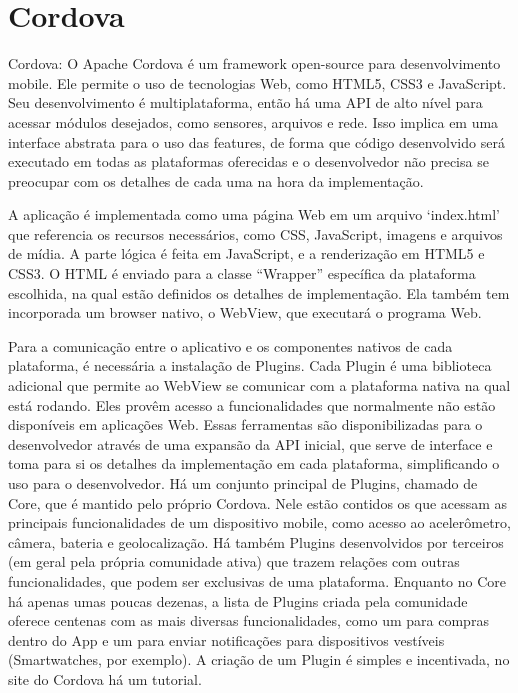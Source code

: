 \documentclass[a4paper,12pt]{article}
\begin{document}
\section{Cordova}

Cordova:
O Apache Cordova é um framework open-source para desenvolvimento mobile. Ele permite o uso de tecnologias Web, como HTML5, CSS3 e JavaScript. Seu desenvolvimento é multiplataforma, então há uma API de alto nível para acessar módulos desejados, como sensores, arquivos e rede. Isso implica em uma interface abstrata para o uso das features, de forma que código desenvolvido será executado em todas as plataformas oferecidas e o desenvolvedor não precisa se preocupar com os detalhes de cada uma na hora da implementação.


A aplicação é implementada como uma página Web em um arquivo ‘index.html’ que referencia os recursos necessários, como CSS, JavaScript, imagens e arquivos de mídia. A parte lógica é feita em JavaScript, e a renderização em HTML5 e CSS3. O HTML é enviado para a classe “Wrapper” específica da plataforma escolhida, na qual estão definidos os detalhes de implementação. Ela também tem incorporada um browser nativo, o WebView, que executará o programa Web.


Para a comunicação entre o aplicativo e os componentes nativos de cada plataforma, é necessária a instalação de Plugins.
Cada Plugin é uma biblioteca adicional que permite ao WebView se comunicar com a plataforma nativa na qual está rodando. Eles provêm acesso a funcionalidades que normalmente não estão disponíveis em aplicações Web. Essas ferramentas são disponibilizadas para o desenvolvedor através de uma expansão da API inicial, que serve de interface e toma para si os detalhes da implementação em cada plataforma, simplificando o uso para o desenvolvedor.
Há um conjunto principal de Plugins, chamado de Core, que é mantido pelo próprio Cordova. Nele estão contidos os que acessam as principais funcionalidades de um dispositivo mobile, como acesso ao acelerômetro, câmera, bateria e geolocalização.
Há também Plugins desenvolvidos por terceiros (em geral pela própria comunidade ativa) que trazem relações com outras funcionalidades, que podem ser exclusivas de uma plataforma. Enquanto no Core há apenas umas poucas dezenas, a lista de Plugins criada pela comunidade oferece centenas com as mais diversas funcionalidades, como um para compras dentro do App e um para enviar notificações para dispositivos vestíveis (Smartwatches, por exemplo). A criação de um Plugin é simples e incentivada, no site do Cordova há um tutorial.
\end{document}
